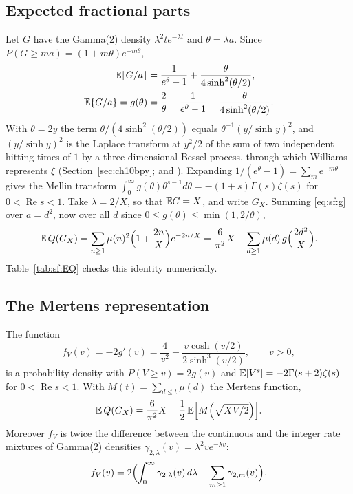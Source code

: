 \subsection{Expected fractional parts}
Let $G$ have the Gamma(2) density $\lambda^2te^{-\lambda t}$ and $\theta=\lambda a$. Since $P(G\ge ma)=(1+m\theta)e^{-m\theta}$,
\begin{equation}\label{eq:sf:g}
\begin{aligned}
\mathbb{E}\lfloor G/a\rfloor&=\frac{1}{e^\theta-1}+\frac{\theta}{4\sinh^2(\theta/2)},\\
\mathbb{E}\{G/a\}=g(\theta)&=\frac2\theta-\frac{1}{e^\theta-1}-\frac{\theta}{4\sinh^2(\theta/2)} .
\end{aligned}
\end{equation}
With $\theta=2y$ the term $\theta/(4\sinh^2(\theta/2))$ equals $\theta^{-1}(y/\sinh y)^2$, and $(y/\sinh y)^2$ is the Laplace transform at $y^2/2$ of the sum of two independent hitting times of $1$ by a three dimensional Bessel process, through which Williams represents $\xi$ (Section~\ref{sec:ch10bpy}; \cite[Section~5]{williams1990} and \cite[(6) to (8) and Table~2]{bpy2001}). Expanding $1/(e^\theta-1)=\sum_me^{-m\theta}$ gives the Mellin transform $\int_0^\infty g(\theta)\theta^{s-1}d\theta=-(1+s)\Gamma(s)\zeta(s)$ for $0<\operatorname{Re} s<1$. Take $\lambda=2/X$, so that $\mathbb{E} G=X$, and write $G_X$. Summing \eqref{eq:sf:g} over $a=d^2$, now over all $d$ since $0\le g(\theta)\le\min(1,2/\theta)$,
\begin{equation}\label{eq:sf:EQ}
\mathbb{E}\,Q(G_X)=\sum_{n\ge1}\mu(n)^2\Bigl(1+\frac{2n}{X}\Bigr)e^{-2n/X}=\frac{6}{\pi^2}X-\sum_{d\ge1}\mu(d)\,g\Bigl(\frac{2d^2}{X}\Bigr).
\end{equation}
Table~\ref{tab:sf:EQ} checks this identity numerically.

\subsection{The Mertens representation}

\begin{theorem}\label{thm:sf:mertens}
The function
\[
f_V(v)=-2g'(v)=\frac{4}{v^2}-\frac{v\cosh(v/2)}{2\sinh^3(v/2)},\qquad v>0,
\]
is a probability density with $P(V\ge v)=2g(v)$ and $\mathbb{E}[V^s]=-2\Gamma(s+2)\zeta(s)$ for $0<\operatorname{Re} s<1$. With $M(t)=\sum_{d\le t}\mu(d)$ the Mertens function,
\[
\mathbb{E}\,Q(G_X)=\frac{6}{\pi^2}X-\frac12\,\mathbb{E}\Bigl[M\Bigl(\sqrt{XV/2}\Bigr)\Bigr].
\]
Moreover $f_V$ is twice the difference between the continuous and the integer rate mixtures of Gamma(2) densities $\gamma_{2,\lambda}(v)=\lambda^2ve^{-\lambda v}$:
\[
f_V(v)=2\Bigl(\int_0^\infty\gamma_{2,\lambda}(v)\,d\lambda-\sum_{m\ge1}\gamma_{2,m}(v)\Bigr).
\]
\end{theorem}


